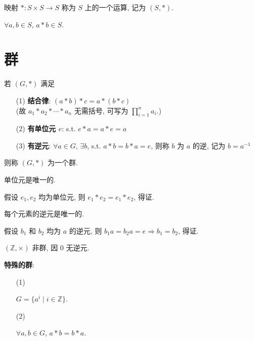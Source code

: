 \documentclass{note}
\begin{document}
\begin{df}[运算]
    映射 $*:S\times S\rightarrow S$ 称为 $S$ 上的一个运算, 记为 $(S,*)$.
\end{df}

$\forall a,b\in S$, $a*b\in S$.

\section{群}
\begin{df}[群]
    若 $(G,*)$ 满足
    \begin{itemize}
        \item[(1)] \textbf{结合律}: $(a*b)*c=a*(b*c)$\\
        (故 $a_1*a_2*\cdots*a_n$ 无需括号, 可写为 $\prod_{i=1}^na_i$.)
        \item[(2)] \textbf{有单位元 $e$}: s.t. $e*a=a*e=a$
        \item[(3)] \textbf{有逆元}: $\forall a\in G$, $\exists b$, s.t. $a*b=b*a=e$, 则称 $b$ 为 $a$ 的逆, 记为 $b=a^{-1}$
    \end{itemize}
    则称 $(G,*)$ 为一个群.
\end{df}

\begin{thm}
    单位元是唯一的.
\end{thm}
\begin{pf}
    假设 $e_1,e_2$ 均为单位元, 则 $e_1*e_2=e_1*e_2$, 得证.
\end{pf}

\begin{thm}
    每个元素的逆元是唯一的.
\end{thm}
\begin{pf}
    假设 $b_1$ 和 $b_2$ 均为 $a$ 的逆元, 则 $b_1a=b_2a=e\Longrightarrow b_1=b_2$, 得证.
\end{pf}

\begin{eg}
    $(\mathbb{Z},\times)$ 非群, 因 $0$ 无逆元.
\end{eg}

\textbf{特殊的群}:
\begin{itemize}
    \item[(1)] \begin{eg}[循环群]
        $G=\{a^i\mid i\in\mathbb{Z}\}$.
    \end{eg}
    \item[(2)] \begin{eg}
        $\forall a,b\in G$, $a*b=b*a$.
    \end{eg}
\end{itemize}
\end{document}
